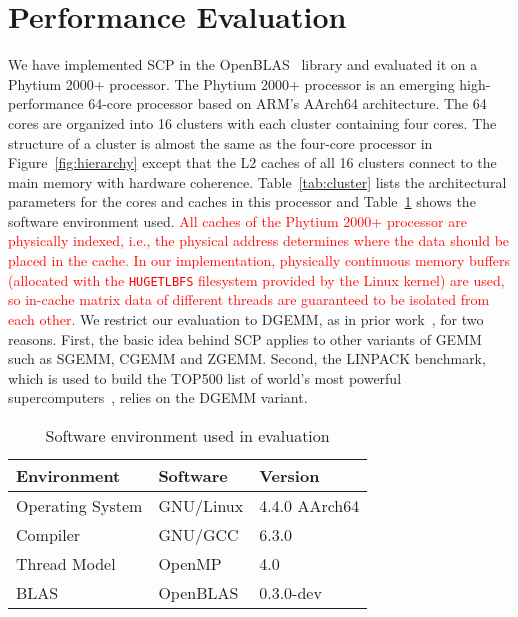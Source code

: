 \section{Performance Evaluation}\label{sec:evaluation}

We have implemented SCP in the OpenBLAS~\cite{openblas} library
and evaluated it on a Phytium 2000+ processor.
The Phytium 2000+ processor is an emerging high-performance
64-core processor based on ARM's AArch64 architecture.
The 64 cores are organized into 16 clusters with each
cluster containing four cores.
The structure of a cluster is almost the same as
the four-core processor in Figure~\ref{fig:hierarchy}
except that the L2 caches of all 16 clusters connect to the main memory
with hardware coherence.
Table~\ref{tab:cluster} lists the
architectural parameters for the cores and caches
in this processor
and Table~\ref{tab:software} shows the software environment used.
\textcolor{red}{
All caches of the Phytium 2000+ processor are physically indexed,
i.e., the physical address determines where the data should
be placed in the cache. In our implementation, physically continuous
memory buffers (allocated with the \texttt{HUGETLBFS} filesystem
provided by the Linux kernel) are used,
so in-cache matrix data of different threads
are guaranteed to be isolated from each other.
}
We restrict our evaluation to DGEMM,
as in prior work~\cite{blispar,augem,poetmicro}, for two reasons.
First, the basic idea behind SCP applies to other
variants of GEMM such as SGEMM, CGEMM and ZGEMM.
Second, the LINPACK benchmark, which is used to build the
TOP500 list of world's most powerful supercomputers~\cite{top500},
relies on the DGEMM variant.

\begin{table}
  \centering
  \caption{Software environment used in evaluation}
  \label{tab:software}
  \begin{tabular}{lll}
    \toprule
    Environment & Software & Version \\
    \midrule
    Operating System & GNU/Linux & 4.4.0 AArch64 \\
    Compiler & GNU/GCC & 6.3.0 \\
    Thread Model & OpenMP & 4.0 \\
    BLAS & OpenBLAS & 0.3.0-dev \\
    \bottomrule
  \end{tabular}
\end{table}


